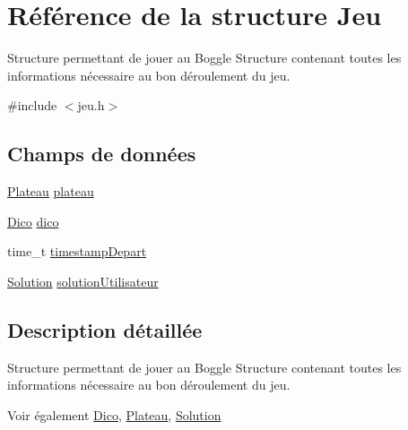 \hypertarget{structJeu}{\section{Référence de la structure Jeu}
\label{structJeu}
}


Structure permettant de jouer au Boggle Structure contenant toutes les informations nécessaire au bon déroulement du jeu.  




{\ttfamily \#include $<$jeu.\-h$>$}

\subsection*{Champs de données}
\begin{DoxyCompactItemize}
\item 
\hyperlink{structPlateau}{Plateau} \hyperlink{structJeu_af2931c71f6de940ec7ed3fcd2f9d7158}{plateau}
\item 
\hyperlink{structDico}{Dico} \hyperlink{structJeu_a6bda384c6fca4e83ae15ac69f2228a41}{dico}
\item 
time\-\_\-t \hyperlink{structJeu_af48a5fddf1dc40b7c4a85918d73f201d}{timestamp\-Depart}
\item 
\hyperlink{structSolution}{Solution} \hyperlink{structJeu_ae8e1dca71285915404d1de4ff609a1d6}{solution\-Utilisateur}
\end{DoxyCompactItemize}


\subsection{Description détaillée}
Structure permettant de jouer au Boggle Structure contenant toutes les informations nécessaire au bon déroulement du jeu. 

\begin{DoxySeeAlso}{Voir également}
\hyperlink{structDico}{Dico}, \hyperlink{structPlateau}{Plateau}, \hyperlink{structSolution}{Solution} 
\end{DoxySeeAlso}


